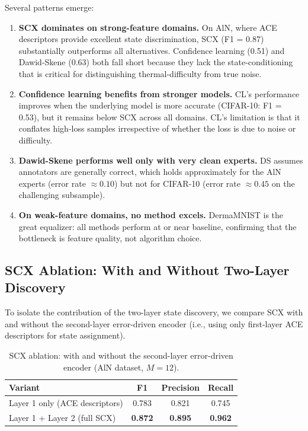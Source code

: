 \documentclass[11pt,a4paper]{article}
\begin{document}
Several patterns emerge:

\begin{enumerate}
    \item \textbf{SCX dominates on strong-feature domains.} On AlN, where ACE descriptors provide excellent state discrimination, SCX (F1 = 0.87) substantially outperforms all alternatives. Confidence learning (0.51) and Dawid-Skene (0.63) both fall short because they lack the state-conditioning that is critical for distinguishing thermal-difficulty from true noise.

    \item \textbf{Confidence learning benefits from stronger models.} CL's performance improves when the underlying model is more accurate (CIFAR-10: F1 = 0.53), but it remains below SCX across all domains. CL's limitation is that it conflates high-loss samples irrespective of whether the loss is due to noise or difficulty.

    \item \textbf{Dawid-Skene performs well only with very clean experts.} DS assumes annotators are generally correct, which holds approximately for the AlN experts (error rate $\approx 0.10$) but not for CIFAR-10 (error rate $\approx 0.45$ on the challenging subsample).

    \item \textbf{On weak-feature domains, no method excels.} DermaMNIST is the great equalizer: all methods perform at or near baseline, confirming that the bottleneck is feature quality, not algorithm choice.
\end{enumerate}

\subsection{SCX Ablation: With and Without Two-Layer Discovery}

To isolate the contribution of the two-layer state discovery, we compare SCX with and without the second-layer error-driven encoder (i.e., using only first-layer ACE descriptors for state assignment).

\begin{table}[H]
\centering
\caption{SCX ablation: with and without the second-layer error-driven encoder (AlN dataset, $M = 12$).}
\label{tab:S3_ablation}
\begin{tabular}{lccc}
\toprule
Variant & F1 & Precision & Recall \\
\midrule
Layer 1 only (ACE descriptors) & 0.783 & 0.821 & 0.745 \\
Layer 1 + Layer 2 (full SCX) & \textbf{0.872} & \textbf{0.895} & \textbf{0.962} \\
\bottomrule
\end{tabular}
\end{table}
\end{document}
